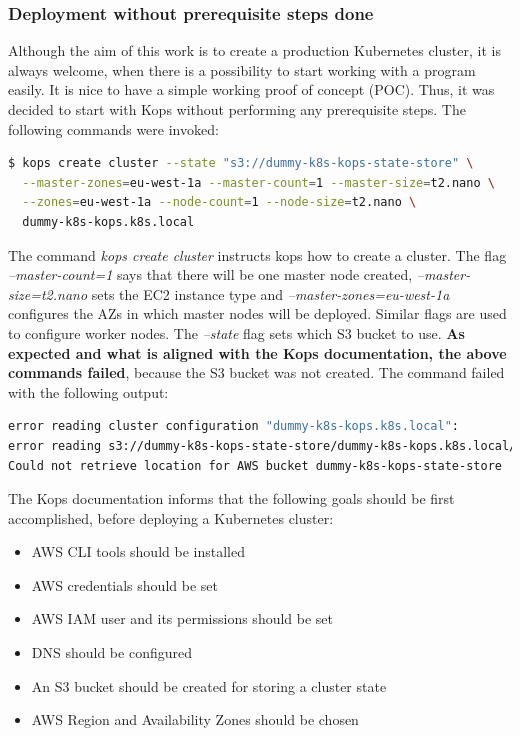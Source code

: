 \subsubsection{Deployment without prerequisite steps done}

Although the aim of this work is to create a production Kubernetes cluster, it is always welcome, when there is a possibility to start working with a program easily. It is nice to have a simple working proof of concept (POC). Thus, it was decided to start with Kops without performing any prerequisite steps. The following commands were invoked:
\begin{lstlisting}[basicstyle=\tiny,caption={Command used to create a cluster with kops, without prerequisite steps performed},captionpos=b,language=Bash,xleftmargin=1cm]
$ kops create cluster --state "s3://dummy-k8s-kops-state-store" \
  --master-zones=eu-west-1a --master-count=1 --master-size=t2.nano \
  --zones=eu-west-1a --node-count=1 --node-size=t2.nano \
  dummy-k8s-kops.k8s.local
\end{lstlisting}


The command \textit{kops create cluster} instructs kops how to create a cluster. The flag \textit{--master-count=1} says that there will be one master node created, \textit{--master-size=t2.nano} sets the EC2 instance type and \textit{--master-zones=eu-west-1a} configures the AZs in which master nodes will be deployed. Similar flags are used to configure worker nodes. The \textit{--state} flag sets which S3 bucket to use.  \textbf{As expected and what is aligned with the Kops documentation\cite{online-kops-aws}, the above commands failed}, because the S3 bucket was not created. The command failed with the following output:
\begin{lstlisting}[basicstyle=\tiny,caption={Output of the commands used to create a cluster with Kops, without prerequisite steps performed},captionpos=b,language=Bash,xleftmargin=1cm]
error reading cluster configuration "dummy-k8s-kops.k8s.local":
error reading s3://dummy-k8s-kops-state-store/dummy-k8s-kops.k8s.local/config:
Could not retrieve location for AWS bucket dummy-k8s-kops-state-store
\end{lstlisting}

The Kops documentation\cite{online-kops-aws} informs that the following goals should be first accomplished, before deploying a Kubernetes cluster:
\begin{itemize}
\item AWS CLI tools should be installed
\item AWS credentials should be set
\item AWS IAM user and its permissions should be set
\item DNS should be configured
\item An S3 bucket should be created for storing a cluster state
\item AWS Region and Availability Zones should be chosen
\end{itemize}

